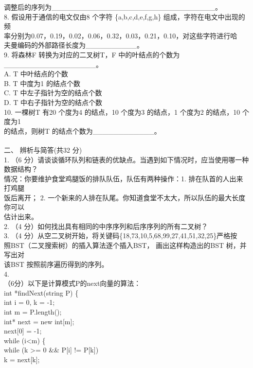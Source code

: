 \begin{question}
调整后的序列为\_\_\_\_\_\_\_\_\_\_\_\_\_\_\_\_\_\_\_\_\_\_\_\_\_\_\_\_\_\_\_\_。\\
8. 假设用于通信的电文仅由8 个字符 \{a,b,c,d,e,f,g,h\} 组成，字符在电文中出现的频\\
率分别为0.07，0.19，0.02，0.06，0.32，0.03，0.21，0.10，对这些字符进行哈\\
夫曼编码的外部路径长度为\_\_\_\_\_\_\_\_\_\_。\\
9. 将森林F 转换为对应的二叉树T，F 中的叶结点的个数为\_\_\_\_\_\_\_\_\_\_\_\_\_\_\_\_\_\_。\\
A. T 中叶结点的个数\\
B. T 中度为1 的结点个数\\
C. T 中左子指针为空的结点个数\\
D. T 中右子指针为空的结点个数\\
10. 一棵树T 有20 个度为4 的结点，10 个度为3 的结点，1 个度为2 的结点，10 个度为1\\
的结点，则树T 的结点个数为\_\_\_\_\_\_\_\_\_\_\_\_。\\
\\
二、 辨析与简答(共32 分)\\
1. （6 分）请谈谈循环队列和链表的优缺点。当遇到如下情况时，应当使用哪一种数据结构？\\
情况：你要维护食堂鸡腿饭的排队队伍，队伍有两种操作：1. 排在队首的人出来打鸡腿\\
饭后离开； 2. 一个新来的人排在队尾。你知道食堂不太大，所以队伍的最大长度你可以\\
估计出来。\\
2. （4 分）如何找出具有相同的中序序列和后序序列的所有二叉树？\\
3. （4 分）从空二叉树开始，将关键码\{18,73,10,5,68,99,27,41,51,32,25\}严格按\\
照BST（二叉搜索树）的插入算法逐个插入BST， 画出这样构造出的BST 树，并写出对\\
该BST 按照前序遍历得到的序列。\\
4.\\
（6分）以下是计算模式P的next向量的算法：\\
int *findNext(string P) \{\\
int i = 0,  k = -1;\\
int m = P.length();\\
int* next = new int[m];\\
next[0] = -1;\\
while (i<m) \{\\
while (k >= 0 \&\& P[i] != P[k])\\
k = next[k];\\

\end{question}
